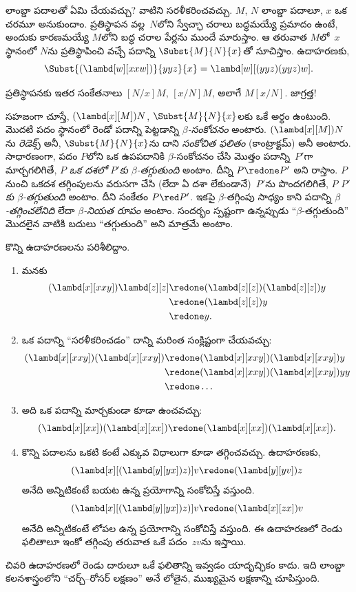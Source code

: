 \documentclass[../../../include/open-logic-section]{subfiles}
\begin{document}

లాంబ్డా పదాలతో ఏమి చేయవచ్చు? వాటిని సరళీకరించవచ్చు. $M$, $N$
లాంబ్డా పదాలూ, $x$ ఒక చరమూ అనుకుందాం. ప్రతిస్థాపన వల్ల~$N$లోని
స్వేచ్ఛా చరాలు బద్ధమయ్యే ప్రమాదం ఉంటే, అందుకు కారణమయ్యే $M$లోని
బద్ధ చరాల పేర్లను ముందే మారుస్తాం. ఆ తరువాత $M$లో~$x$ స్థానంలో $N$ను
ప్రతిస్థాపించి వచ్చే పదాన్ని $\Subst{M}{N}{x}$తో సూచిస్తాం. ఉదాహరణకు,
\[
\Subst{(\lambd[w][xxw])}{yyz}{x} = \lambd[w][(yyz)(yyz)w].
\]

\begin{digress}
ప్రతిస్థాపనకు ఇతర సంకేతనాలు $[N/x]M$, $[x/N]M$, అలాగే $M[x/N]$.
జాగ్రత్త!
\end{digress}

సహజంగా చూస్తే, $(\lambd[x][M])N$, $\Subst{M}{N}{x}$లకు ఒకే
అర్థం ఉంటుంది. మొదటి పదం స్థానంలో రెండో పదాన్ని పెట్టడాన్ని
\emph{$\beta$-సంకోచనం} అంటారు. $(\lambd[x][M])N$ను
\emph{రెడెక్స్} అనీ, $\Subst{M}{N}{x}$ను దాని
\emph{సంకోచిత ఫలితం} (కాంట్రాక్టమ్) అనీ అంటారు. సాధారణంగా, పదం
$P$లోని ఒక ఉపపదానికి $\beta$-సంకోచనం చేసి మొత్తం పదాన్ని~$P'$గా మార్చగలిగితే,
$P$ \emph{ఒక దశలో $P'$కు $\beta$-తగ్గుతుంది} అంటాం. దీన్ని
$P \redone P'$ అని రాస్తాం. $P$ నుంచి ఒకదశ తగ్గింపులను వరుసగా చేసి
(లేదా ఏ దశా లేకుండానే)~$P'$ను పొందగలిగితే, $P$ \emph{$P'$కు
$\beta$-తగ్గుతుంది} అంటాం. దీని సంకేతం $P \red P'$. ఇకపై $\beta$-తగ్గింపు
సాధ్యం కాని పదాన్ని \emph{$\beta$-తగ్గించలేనిది} లేదా \emph{$\beta$-నియత రూపం}
అంటాం. సందర్భం స్పష్టంగా ఉన్నప్పుడు ``$\beta$-తగ్గుతుంది'' మొదలైన వాటికి
బదులు ``తగ్గుతుంది'' అని మాత్రమే అంటాం.

కొన్ని ఉదాహరణలను పరిశీలిద్దాం.
\begin{enumerate}
\item మనకు
\begin{align*}
(\lambd[x][xxy]) \lambd[z][z] & \redone (\lambd[z][z])(\lambd[z][z]) y \\
& \redone (\lambd[z][z]) y \\
& \redone y.
\end{align*}
\item ఒక పదాన్ని ``సరళీకరించడం'' దాన్ని మరింత సంక్లిష్టంగా చేయవచ్చు:
\begin{align*}
(\lambd[x][xxy])(\lambd[x][xxy]) & \redone (\lambd[x][xxy])(\lambd[x][xxy])y \\
& \redone (\lambd[x][xxy])(\lambd[x][xxy])yy \\
& \redone \dots
\end{align*}
\item అది ఒక పదాన్ని మార్చకుండా కూడా ఉంచవచ్చు:
\[
(\lambd[x][xx])(\lambd[x][xx]) \redone (\lambd[x][xx])(\lambd[x][xx]).
\]
\item కొన్ని పదాలను ఒకటి కంటే ఎక్కువ విధాలుగా కూడా తగ్గించవచ్చు.
  ఉదాహరణకు,
\[
(\lambd[x][(\lambd[y][yx]) z)] v \redone (\lambd[y][yv]) z
\]
అనేది అన్నిటికంటే బయట ఉన్న ప్రయోగాన్ని సంకోచిస్తే వస్తుంది.
\[
(\lambd[x][(\lambd[y][yx]) z)] v \redone (\lambd[x][zx]) v
\]
అనేది అన్నిటికంటే లోపల ఉన్న ప్రయోగాన్ని సంకోచిస్తే వస్తుంది. ఈ ఉదాహరణలో
రెండు ఫలితాలూ ఇంకో తగ్గింపు తరువాత ఒకే పదం~$zv$ను ఇస్తాయి.
\end{enumerate}

చివరి ఉదాహరణలో రెండు దారులూ ఒకే ఫలితాన్ని ఇవ్వడం యాదృచ్ఛికం కాదు.
ఇది లాంబ్డా కలనశాస్త్రంలోని ``చర్చ్--రోసర్ లక్షణం'' అనే లోతైన, ముఖ్యమైన లక్షణాన్ని
చూపిస్తుంది.
\end{document}
